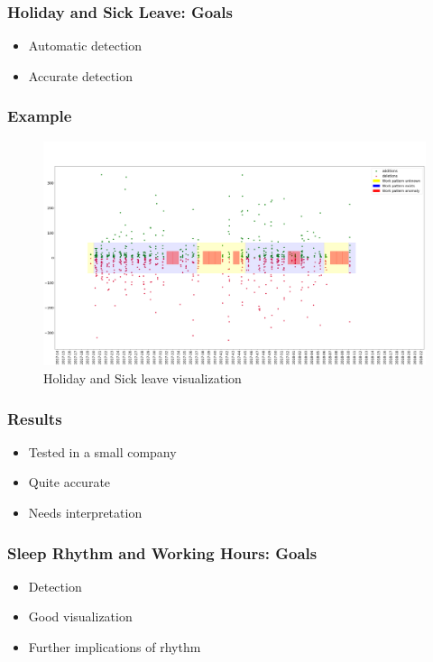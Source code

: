 \documentclass[t]{beamer}
\begin{document}
\begin{frame}
    \frametitle{Holiday and Sick Leave: Goals}
    \begin{itemize}
        \item Automatic detection
        \pause{}
        \item Accurate detection
    \end{itemize}
\end{frame}

\begin{frame}
    \frametitle{Example}
    \begin{figure}[H]
        \includegraphics[scale=0.115]{analysis/work-time-analysis}
        \centering
        \caption{Holiday and Sick leave visualization}
    \end{figure}
\end{frame}

\begin{frame}
    \frametitle{Results}
    \begin{itemize}
        \item Tested in a small company
        \pause{}
        \item Quite accurate
        \pause{}
        \item Needs interpretation
    \end{itemize}
\end{frame}

\begin{frame}
    \frametitle{Sleep Rhythm and Working Hours: Goals}
    \begin{itemize}
        \item Detection
        \pause{}
        \item Good visualization
        \pause{}
        \item Further implications of rhythm
    \end{itemize}
\end{frame}
\end{document}

